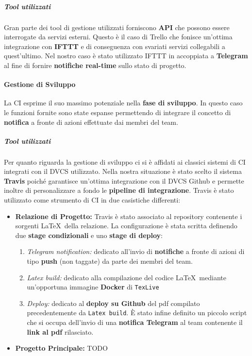 \subparagraph{Tool utilizzati}
Gran parte dei tool di gestione utilizzati forniscono \textbf{API} che possono essere interrogate da servizi esterni. Questo è il caso di Trello che fonisce un'ottima integrazione con \textbf{IFTTT} e di conseguenza con svariati servizi collegabili a quest'ultimo. Nel nostro caso è stato utilizzato IFTTT in accoppiata a \textbf{Telegram} al fine di fornire \textbf{notifiche real-time} sullo stato di progetto.


\paragraph{Gestione di Sviluppo}
La CI esprime il suo massimo potenziale nella \textbf{fase di sviluppo}. In questo caso le funzioni fornite sono state espanse permettendo di integrare il concetto di \textbf{notifica} a fronte di azioni effettuate dai membri del team.

\subparagraph{Tool utilizzati}
Per quanto riguarda la gestione di sviluppo ci si è affidati ai classici sistemi di CI integrati con il DVCS utilizzato. Nella nostra situazione è stato scelto il sistema \textbf{Travis} poiché garantisce un'ottima integrazione con il DVCS Github e permette inoltre di personalizzare a fondo le \textbf{pipeline di integrazione}. Travis è stato utilizzato come strumento di CI in due casistiche differenti: 
\begin{itemize}
	\item{\textbf{Relazione di Progetto:}}
	Travis è stato associato al repository contenente i sorgenti \LaTeX~della relazione. La configurazione è stata scritta definendo due \textbf{stage condizionali} e uno \textbf{stage di deploy}:
	\begin{enumerate}
	 	\item{\textit{Telegram notification:}}
	 	dedicato all'invio di \textbf{notifiche} a fronte di azioni di tipo \textbf{push} (non taggate) da parte dei membri del team.
	 	\item{\textit{Latex build:}}
	 	dedicato alla compilazione del codice \LaTeX~mediante un'opportuna immagine \textbf{Docker} di \texttt{TexLive}  
	 	\item{\textit{Deploy:}}
	 	dedicato al \textbf{deploy su Github} del pdf compilato precedentemente da \texttt{Latex build}. È stato infine definito un piccolo script che si occupa dell'invio di una \textbf{notifica Telegram} al team contenente il \textbf{link al pdf} rilasciato.
	 \end{enumerate}
	 \item{\textbf{Progetto Principale:}}
	 \huge TODO
\end{itemize}









